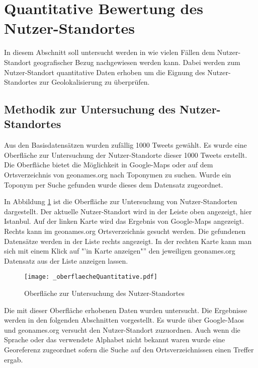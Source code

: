 	\section{Quantitative Bewertung des Nutzer-Standortes}

		In diesem Abschnitt soll untersucht werden in wie vielen Fällen dem Nutzer-Standort geografischer Bezug nachgewiesen werden kann.
		Dabei werden zum Nutzer-Standort quantitative Daten erhoben um die Eignung des Nutzer-Standortes zur Geolokalisierung zu überprüfen.

		\subsection{Methodik zur Untersuchung des Nutzer-Standortes}

			Aus den Basisdatensätzen wurden zufällig 1000 Tweets gewählt. 
			Es wurde eine Oberfläche zur Untersuchung der Nutzer-Standorte dieser 1000 Tweets erstellt.
			Die Oberfläche bietet die Möglichkeit in Google-Maps oder auf dem Ortsverzeichnis von geonames.org nach Toponymen zu suchen.
			Wurde ein Toponym per Suche gefunden wurde dieses dem Datensatz zugeordnet.

			In Abbildung \ref{img:oberflaecheQuantitative} ist die Oberfläche zur Untersuchung von Nutzer-Standorten dargestellt. 
			Der aktuelle Nutzer-Standort wird in der Leiste oben angezeigt, hier Istanbul. 
			Auf der linken Karte wird das Ergebnis von Google-Maps angezeigt.
			Rechts kann im geonames.org Ortsverzeichnis gesucht werden. 
			Die gefundenen Datensätze werden in der Liste rechts angezeigt.  
			In der rechten Karte kann man sich mit einem Klick auf "'in Karte anzeigen"'' den jeweiligen geonames.org Datensatz aus der Liste anzeigen lassen.

			\begin{figure}[!ht]
					\begin{center}
						\texttt{[image: \_oberflaecheQuantitative.pdf]}
						\caption{Oberfläche zur Untersuchung des Nutzer-Standortes}
						\label{img:oberflaecheQuantitative}
					\end{center}  
			\end{figure}	

			Die mit dieser Oberfläche erhobenen Daten wurden untersucht. 
			Die Ergebnisse werden in den folgenden Abschnitten vorgestellt.
			Es wurde über Google-Maos und geonames.org versucht den Nutzer-Standort zuzuordnen. 
			Auch wenn die Sprache oder das verwendete Alphabet nicht bekannt waren wurde eine Georeferenz zugeordnet sofern die Suche auf den Ortsverzeichnissen einen Treffer ergab. 


